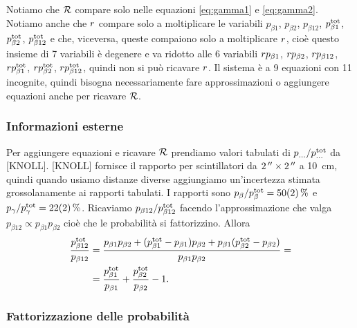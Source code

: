 Notiamo che $\Rtot$ compare solo nelle equazioni \eqref{eq:gamma1} e \eqref{eq:gamma2}.
Notiamo anche che $\R$ compare solo a moltiplicare le variabili
$p_{\beta1}$, $p_{\beta2}$, $p_{\beta12}$, $p_{\beta1}\tot$, $p_{\beta2}\tot$, $p_{\beta12}\tot$
e che, viceversa, queste compaiono solo a moltiplicare $\R$,
cioè questo insieme di 7 variabili è degenere e va ridotto alle 6 variabili
$\R p_{\beta1}$, $\R p_{\beta2}$, $\R p_{\beta12}$, $\R p_{\beta1}\tot$, $\R p_{\beta2}\tot$, $\R p_{\beta12}\tot$,
quindi non si può ricavare $\R$.
Il sistema è a 9 equazioni con 11 incognite,
quindi bisogna necessariamente fare approssimazioni o aggiungere equazioni anche per ricavare $\Rtot$.

\subsubsection{Informazioni esterne}

Per aggiungere equazioni e ricavare $\Rtot$
prendiamo valori tabulati di $p_{\dots} / p_{\dots}\tot$ da [KNOLL].
[KNOLL] fornisce il rapporto per scintillatori da $\SI{2}{''}\times\SI2{''}$ a \SI{10}{cm},
quindi quando usiamo distanze diverse aggiungiamo un'incertezza stimata grossolanamente ai rapporti tabulati.
I rapporti sono
$p_\beta / p_\beta\tot = \SI{50(2)}\%$ e
$p_\gamma / p_\gamma\tot = \SI{22(2)}\%$.
Ricaviamo $p_{\beta12} / p_{\beta12}\tot$ facendo l'approssimazione che valga
$p_{\beta12}\propto p_{\beta1}p_{\beta2}$ cioè che le probabilità si fattorizzino.
Allora
\begin{align*}
	\frac{p_{\beta12}\tot}{p_{\beta12}}
	&= \frac
	{p_{\beta1}p_{\beta2} + (p_{\beta1}\tot - p_{\beta1}) p_{\beta2} + p_{\beta1} (p_{\beta2}\tot - p_{\beta2})}
	{p_{\beta1}p_{\beta2}} = \\
	&= \frac{p_{\beta1}\tot}{p_{\beta1}} + \frac{p_{\beta2}\tot}{p_{\beta2}} - 1.
\end{align*}

\subsubsection{Fattorizzazione delle probabilità}

